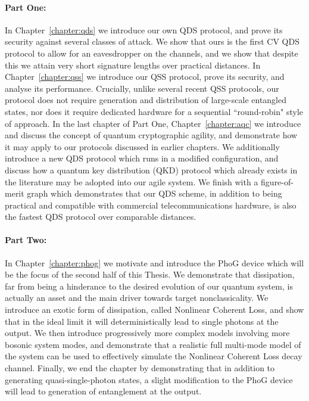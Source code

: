 \paragraph{Part One:} In Chapter~\ref{chapter:qds} we introduce our own QDS protocol, and prove its security against several classes of attack. We show that ours is the first CV QDS protocol to allow for an eavesdropper on the channels, and we show that despite this we attain very short signature lengths over practical distances. In Chapter~\ref{chapter:qss} we introduce our QSS protocol, prove its security, and analyse its performance. Crucially, unlike several recent QSS protocols, our protocol does not require generation and distribution of large-scale entangled states, nor does it require dedicated hardware for a sequential ``round-robin" style of approach. In the last chapter of Part One, Chapter~\ref{chapter:aqc} we introduce and discuss the concept of quantum cryptographic agility, and demonstrate how it may apply to our protocols discussed in earlier chapters. We additionally introduce a new QDS protocol which runs in a modified configuration, and discuss how a quantum key distribution (QKD) protocol which already exists in the literature may be adopted into our agile system. We finish with a figure-of-merit graph which demonstrates that our QDS scheme, in addition to being practical and compatible with commercial telecommunications hardware, is also the fastest QDS protocol over comparable distances. 

\paragraph{Part Two:} In Chapter~\ref{chapter:phog} we motivate and introduce the PhoG device which will be the focus of the second half of this Thesis. We demonstrate that dissipation, far from being a hinderance to the desired evolution of our quantum system, is actually an asset and the main driver towards target nonclassicality. We introduce an exotic form of dissipation, called Nonlinear Coherent Loss, and show that in the ideal limit it will deterministically lead to single photons at the output. We then introduce progressively more complex models involving more bosonic system modes, and demonstrate that a realistic full multi-mode model of the system can be used to effectively simulate the Nonlinear Coherent Loss decay channel. Finally, we end the chapter by demonstrating that in addition to generating quasi-single-photon states, a slight modification to the PhoG device will lead to generation of entanglement at the output.

